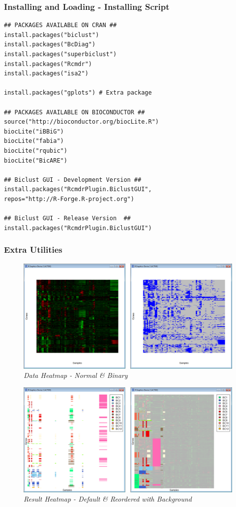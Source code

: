 \documentclass[a4paper]{article}\usepackage[]{graphicx}\usepackage[]{color}
\begin{document}
\subsubsection{Installing and Loading - Installing Script}
\begin{verbatim}
## PACKAGES AVAILABLE ON CRAN ##
install.packages("biclust")
install.packages("BcDiag")
install.packages("superbiclust")
install.packages("Rcmdr")
install.packages("isa2")

install.packages("gplots") # Extra package

## PACKAGES AVAILABLE ON BIOCONDUCTOR ##
source("http://bioconductor.org/biocLite.R")
biocLite("iBBiG")
biocLite("fabia")
biocLite("rqubic")
biocLite("BicARE")

## Biclust GUI - Development Version ##
install.packages("RcmdrPlugin.BiclustGUI", 
repos="http://R-Forge.R-project.org")

## Biclust GUI - Release Version  ##
install.packages("RcmdrPlugin.BiclustGUI")

\end{verbatim}

\subsubsection{Extra Utilities}

\begin{figure}[H]
\centering
\includegraphics[scale=0.33]{figures/drawheatmaps_example1.png}
\caption{{\it Data Heatmap - Normal \& Binary }\label{drawheatmaps_example1}}
\end{figure}
\begin{figure}[H]
\centering
\includegraphics[scale=0.33]{figures/drawheatmaps_example2.png}
\caption{{\it Result Heatmap - Default \& Reordered with Background
}\label{drawheatmaps_example2}}
\end{figure}
\end{document}
